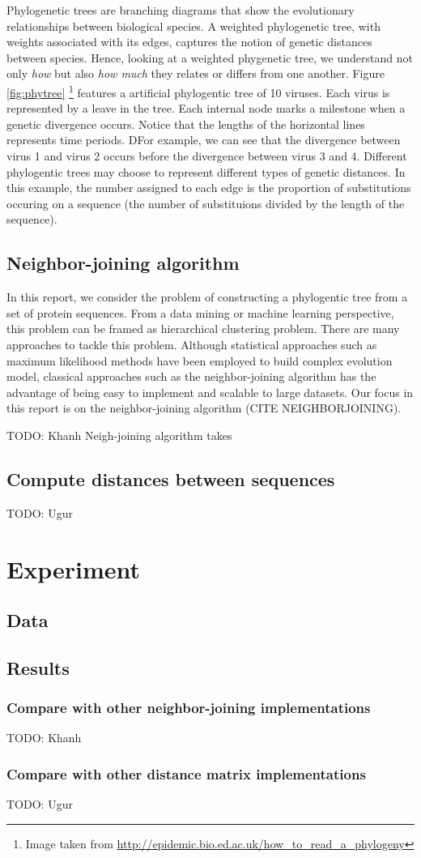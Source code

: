\documentclass[11pt,letterpaper]{article}
\theoremstyle{definition}
\begin{document}
Phylogenetic trees are branching diagrams that show the evolutionary relationships between biological species. A weighted phylogenetic tree, with weights associated with its edges, captures the notion of genetic distances between species. Hence, looking at a weighted phygenetic tree, we understand not only \textit{how} but also \textit{how much} they relates or differs from one another. Figure \ref{fig:phytree} \footnote{Image taken from \url{http://epidemic.bio.ed.ac.uk/how_to_read_a_phylogeny}} features a artificial phylogentic tree of 10 viruses. Each virus is represented by a leave in the tree. Each internal node marks a milestone when a genetic divergence occurs. Notice that the lengths of the horizontal lines represents time periods. DFor example, we can see that the divergence between virus 1 and virus 2 occurs before the divergence between virus 3 and 4. Different phylogentic trees may choose to represent different types of genetic distances. In this example, the number assigned to each edge is the proportion of substitutions occuring on a sequence (the number of substituions divided by the length of the sequence). 

\subsection{Neighbor-joining algorithm}

In this report, we consider the problem of constructing a phylogentic tree from a set of protein sequences. From a data mining or machine learning perspective, this problem can be framed as hierarchical clustering problem. There are many approaches to tackle this problem. Although statistical approaches such as maximum likelihood methods have been employed to build complex evolution model, classical approaches such as the neighbor-joining algorithm has the advantage of being easy to implement and scalable to large datasets. Our focus in this report is on the neighbor-joining algorithm (CITE NEIGHBORJOINING). 

TODO: Khanh 
Neigh-joining algorithm takes 


\subsection{Compute distances between sequences}

TODO: Ugur

\section{Experiment}
\subsection{Data}


\subsection{Results}
\subsubsection{Compare with other neighbor-joining implementations}

TODO: Khanh 

\subsubsection{Compare with other distance matrix implementations}

TODO: Ugur
\end{document}
